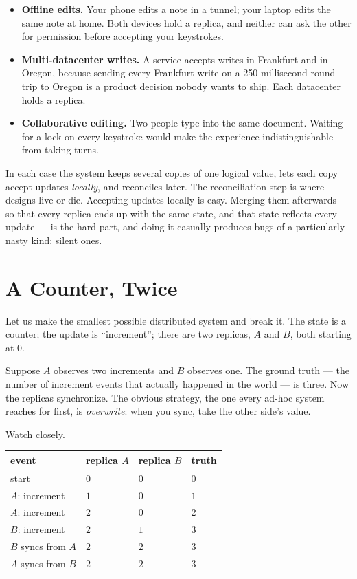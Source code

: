 \documentclass[12pt, a4paper, openright]{book}
\theoremstyle{thmstyle}
\theoremstyle{defstyle}
\begin{document}
\begin{itemize}
  \item \textbf{Offline edits.} Your phone edits a note in a tunnel; your
    laptop edits the same note at home. Both devices hold a replica, and
    neither can ask the other for permission before accepting your
    keystrokes.
  \item \textbf{Multi-datacenter writes.} A service accepts writes in
    Frankfurt and in Oregon, because sending every Frankfurt write on a
    250-millisecond round trip to Oregon is a product decision nobody
    wants to ship. Each datacenter holds a replica.
  \item \textbf{Collaborative editing.} Two people type into the same
    document. Waiting for a lock on every keystroke would make the
    experience indistinguishable from taking turns.
\end{itemize}

In each case the system keeps several copies of one logical value, lets
each copy accept updates \emph{locally}, and reconciles later. The
reconciliation step is where designs live or die. Accepting updates
locally is easy. Merging them afterwards --- so that every replica ends
up with the same state, and that state reflects every update --- is the
hard part, and doing it casually produces bugs of a particularly nasty
kind: silent ones.

\section{A Counter, Twice}

Let us make the smallest possible distributed system and break it. The
state is a counter; the update is ``increment''; there are two replicas,
$A$ and $B$, both starting at $0$.

Suppose $A$ observes two increments and $B$ observes one. The ground
truth --- the number of increment events that actually happened in the
world --- is three. Now the replicas synchronize. The obvious strategy,
the one every ad-hoc system reaches for first, is \emph{overwrite}: when
you sync, take the other side's value.

Watch closely.

\begin{center}
\begin{tabular}{llll}
  \toprule
  event & replica $A$ & replica $B$ & truth \\
  \midrule
  start                     & $0$ & $0$ & $0$ \\
  $A$: increment            & $1$ & $0$ & $1$ \\
  $A$: increment            & $2$ & $0$ & $2$ \\
  $B$: increment            & $2$ & $1$ & $3$ \\
  $B$ syncs from $A$        & $2$ & $2$ & $3$ \\
  $A$ syncs from $B$        & $2$ & $2$ & $3$ \\
  \bottomrule
\end{tabular}
\end{center}
\end{document}
